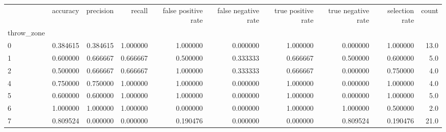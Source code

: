 \begin{tabular}{lrrrrrrrrr}
\toprule
{} &  accuracy &  precision &    recall &  false positive rate &  false negative rate &  true positive rate &  true negative rate &  selection rate &  count \\
throw\_zone &           &            &           &                      &                      &                     &                     &                 &        \\
\midrule
0          &  0.384615 &   0.384615 &  1.000000 &             1.000000 &             0.000000 &            1.000000 &            0.000000 &        1.000000 &   13.0 \\
1          &  0.600000 &   0.666667 &  0.666667 &             0.500000 &             0.333333 &            0.666667 &            0.500000 &        0.600000 &    5.0 \\
2          &  0.500000 &   0.666667 &  0.666667 &             1.000000 &             0.333333 &            0.666667 &            0.000000 &        0.750000 &    4.0 \\
4          &  0.750000 &   0.750000 &  1.000000 &             1.000000 &             0.000000 &            1.000000 &            0.000000 &        1.000000 &    4.0 \\
5          &  0.600000 &   0.600000 &  1.000000 &             1.000000 &             0.000000 &            1.000000 &            0.000000 &        1.000000 &    5.0 \\
6          &  1.000000 &   1.000000 &  1.000000 &             0.000000 &             0.000000 &            1.000000 &            1.000000 &        0.500000 &    2.0 \\
7          &  0.809524 &   0.000000 &  0.000000 &             0.190476 &             0.000000 &            0.000000 &            0.809524 &        0.190476 &   21.0 \\
\bottomrule
\end{tabular}
